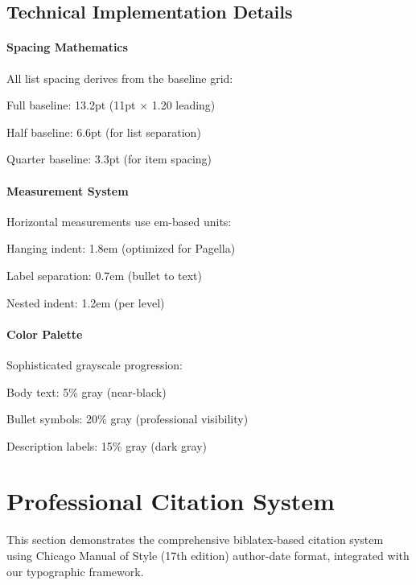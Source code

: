 \documentclass[11pt]{article}
\begin{document}
\subsection{Technical Implementation Details}

\paragraph{Spacing Mathematics} All list spacing derives from the baseline grid:
\begin{compactitem}
\item Full baseline: 13.2pt (11pt × 1.20 leading)
\item Half baseline: 6.6pt (for list separation)
\item Quarter baseline: 3.3pt (for item spacing)
\end{compactitem}

\paragraph{Measurement System} Horizontal measurements use em-based units:
\begin{compactitem}
\item Hanging indent: 1.8em (optimized for Pagella)
\item Label separation: 0.7em (bullet to text)
\item Nested indent: 1.2em (per level)
\end{compactitem}

\paragraph{Color Palette} Sophisticated grayscale progression:
\begin{compactitem}
\item Body text: 5\% gray (near-black)
\item Bullet symbols: 20\% gray (professional visibility)
\item Description labels: 15\% gray (dark gray)
\end{compactitem}

\clearpage

\section{Professional Citation System}

This section demonstrates the comprehensive biblatex-based citation system using Chicago Manual of Style (17th edition) author-date format, integrated with our typographic framework.
\end{document}
